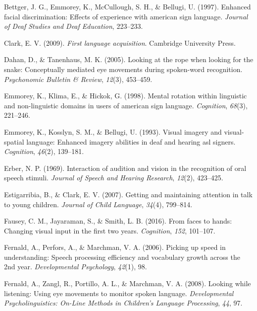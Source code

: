 \documentclass[,man,floatsintext]{apa6}
\begin{document}
\hypertarget{ref-bettger1997enhanced}{}
Bettger, J. G., Emmorey, K., McCullough, S. H., \& Bellugi, U. (1997).
Enhanced facial discrimination: Effects of experience with american sign
language. \emph{Journal of Deaf Studies and Deaf Education}, 223--233.

\hypertarget{ref-clark2009first}{}
Clark, E. V. (2009). \emph{First language acquisition}. Cambridge
University Press.

\hypertarget{ref-dahan2005looking}{}
Dahan, D., \& Tanenhaus, M. K. (2005). Looking at the rope when looking
for the snake: Conceptually mediated eye movements during spoken-word
recognition. \emph{Psychonomic Bulletin \& Review}, \emph{12}(3),
453--459.

\hypertarget{ref-emmorey1998mental}{}
Emmorey, K., Klima, E., \& Hickok, G. (1998). Mental rotation within
linguistic and non-linguistic domains in users of american sign
language. \emph{Cognition}, \emph{68}(3), 221--246.

\hypertarget{ref-emmorey1993visual}{}
Emmorey, K., Kosslyn, S. M., \& Bellugi, U. (1993). Visual imagery and
visual-spatial language: Enhanced imagery abilities in deaf and hearing
asl signers. \emph{Cognition}, \emph{46}(2), 139--181.

\hypertarget{ref-erber1969interaction}{}
Erber, N. P. (1969). Interaction of audition and vision in the
recognition of oral speech stimuli. \emph{Journal of Speech and Hearing
Research}, \emph{12}(2), 423--425.

\hypertarget{ref-estigarribia2007getting}{}
Estigarribia, B., \& Clark, E. V. (2007). Getting and maintaining
attention in talk to young children. \emph{Journal of Child Language},
\emph{34}(4), 799--814.

\hypertarget{ref-fausey2016faces}{}
Fausey, C. M., Jayaraman, S., \& Smith, L. B. (2016). From faces to
hands: Changing visual input in the first two years. \emph{Cognition},
\emph{152}, 101--107.

\hypertarget{ref-fernald2006picking}{}
Fernald, A., Perfors, A., \& Marchman, V. A. (2006). Picking up speed in
understanding: Speech processing efficiency and vocabulary growth across
the 2nd year. \emph{Developmental Psychology}, \emph{42}(1), 98.

\hypertarget{ref-fernald2008looking}{}
Fernald, A., Zangl, R., Portillo, A. L., \& Marchman, V. A. (2008).
Looking while listening: Using eye movements to monitor spoken language.
\emph{Developmental Psycholinguistics: On-Line Methods in Children's
Language Processing}, \emph{44}, 97.
\end{document}
